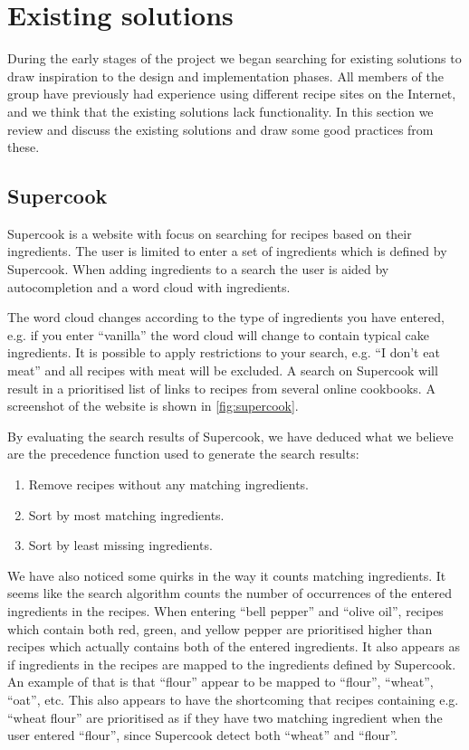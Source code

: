 \section{Existing solutions}\label{sec:exist}

During the early stages of the project we began searching for existing solutions to draw inspiration to the design and implementation phases. All members of the group have previously had experience using different recipe sites on the Internet, and we  think that the existing solutions lack functionality. In this section we review and discuss the existing solutions and draw some good practices from these.

\subsection{Supercook}
Supercook\cite{supercook} is a website with focus on searching for recipes based on their ingredients. The user is limited to enter a set of ingredients which is defined by Supercook. When adding ingredients to a search the user is aided by autocompletion and a word cloud with ingredients.

The word cloud changes according to the type of ingredients you have entered, e.g. if you enter ``vanilla'' the word cloud will change to contain typical cake ingredients. It is possible to apply restrictions to your search, e.g. ``I don't eat meat'' and all recipes with meat will be excluded. A search on Supercook will result in a prioritised list of links to recipes from several online cookbooks. A screenshot of the website is shown in \autoref{fig:supercook}.

By evaluating the search results of Supercook, we have deduced what we believe are the precedence function used to generate the search results:
\begin{enumerate}
	\item Remove recipes without any matching ingredients.
	\item Sort by most matching ingredients.
	\item Sort by least missing ingredients.
\end{enumerate}
We have also noticed some quirks in the way it counts matching ingredients. It seems like the search algorithm counts the number of occurrences of the entered ingredients in the recipes. When entering ``bell pepper'' and ``olive oil'', recipes which contain both red, green, and yellow pepper are prioritised higher than recipes which actually contains both of the entered ingredients. It also appears as if ingredients in the recipes are mapped to the ingredients defined by Supercook. An example of that is that ``flour'' appear to be mapped to ``flour'', ``wheat'', ``oat'', etc. This also appears to have the shortcoming that recipes containing e.g. ``wheat flour'' are prioritised as if they have two matching ingredient when the user entered ``flour'', since Supercook detect both ``wheat'' and ``flour''.

